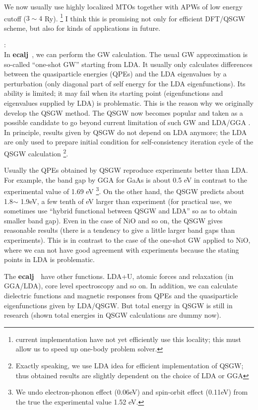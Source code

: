 \documentclass[a4paper,10pt,epsf,fleqn]{article}
\newcommand{\ecalj}{{\bf ecalj}\ }
\begin{document}
We now usually use highly localized MTOs
together with APWs of low energy cutoff ($3\sim 4$ Ry).
\footnote{current
implementation have not yet efficiently use this locality; this must allow
us to speed up one-body problem solver.} 
I think this is promising not only for efficient DFT/QSGW scheme, 
but also for kinds of applications in future. 

:\\
In \ecalj, we can perform the GW calculation.
The usual GW approximation is so-called ``one-shot GW'' starting from LDA. 
It usually only calculates differences between the quasiparticle energies (QPEs) 
and the LDA eigenvalues by a perturbation (only diagonal part of self
energy for the LDA eigenfunctions).
Its ability is limited; it may fail when its starting point 
(eigenfunctions and eigenvalues supplied by LDA) is problematic.
This is the reason why we originally develop the QSGW method. 
The QSGW now becomes popular and taken as a possible candidate to go
beyond current limitation of such GW and LDA/GGA \cite{di_valentin_quasiparticle_2014}.
In principle, results given by QSGW do not depend on LDA anymore; 
the LDA are only used to prepare initial condition for
self-consistency iteration cycle of the QSGW calculation 
\footnote{Exactly speaking, we use LDA idea 
for efficient implementation of QSGW; thus
obtained results are slightly dependent on the choice of LDA or GGA}.

Usually the QPEs obtained by QSGW reproduce experiments better than LDA.
For example, the band gap by GGA for GaAs is about 0.5 eV in contrast
to the experimental value of 1.69 eV
\footnote{We undo electron-phonon effect
(0.06eV) and spin-orbit effect (0.11eV) from the true the experimental value 1.52 eV.}. 
On the other hand, the QSGW predicts about 1.8$\sim$ 1.9eV, a few tenth of eV
larger than experiment (for practical use, we sometimes 
use ``hybrid functional between QSGW and LDA'' 
so as to obtain smaller band gap).
Even in the case of NiO and so on, the QSGW gives reasonable
results (there is a tendency to give a little larger band gaps than experiments).
This is in contrast to the case of the one-shot GW applied to NiO, 
where we can not have good agreement with experiments
because the stating points in LDA is problematic.

The \ecalj\ have other functions.
LDA+U, atomic forces and relaxation (in GGA/LDA), core level
spectroscopy and so on.  In addition, we can calculate
dielectric functions and magnetic responses 
from QPEs and the quasiparticle eigenfunctions 
given by LDA/QSGW.  
But total energy in QSGW is still in research 
(shown total energies in QSGW calculations are dummy now).
\end{document}
